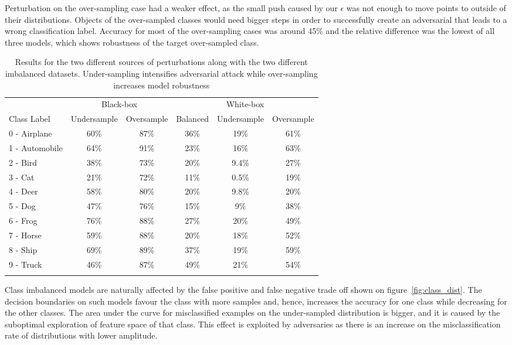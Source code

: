 \documentclass[runningheads,a4paper]{llncs}
\begin{document}
Perturbation on the over-sampling case had a weaker effect, as the small push caused by our $\epsilon$ was not enough to move points to outside of their distributions. Objects of the over-sampled classes would need bigger steps in order to successfully create an adversarial that leads to a wrong classification label. Accuracy for most of the over-sampling cases was around 45\% and the relative difference was the lowest of all three models, which shows robustness of the target over-sampled class. 
\begin{table}
	\centering	
	\begin{tabular}{lccccc}
		\toprule
		&\multicolumn{2}{c}{Black-box}
		&\multicolumn{3}{c}{White-box}
		\\\cmidrule(r){2-3}\cmidrule(l){4-6}
		Class Label &Undersample &Oversample &Balanced &Undersample &Oversample \\
		\midrule
		0 - Airplane &60\%& 87\% &36\%& 19\%    & 61\% \\
		1 - Automobile &64\%& 91\% &23\%& 16\%    & 63\% \\
		2 - Bird &38\%& 73\% &20\%& 9.4\%    & 27\% \\
		3 - Cat &21\%& 72\% &11\%& 0.5\%    & 19\% \\
		4 - Deer &58\%& 80\% &20\%& 9.8\%    & 20\% \\
		5 - Dog &47\%& 76\% &15\%& 9\%    & 38\% \\
		6 - Frog &76\%& 88\% &27\%& 20\%    & 49\% \\
		7 - Horse &59\%& 88\% &20\%& 18\%    & 52\% \\
		8 - Ship &69\%& 89\% &37\%& 19\%    & 59\% \\
		9 - Truck &46\%& 87\% &49\%& 21\%    & 54\% \\
		\bottomrule
		\hfill
	\end{tabular}
	\caption{Results for the two different sources of perturbations along with the two different imbalanced datasets. Under-sampling intensifies adversarial attack while over-sampling increases model robustness}
	\label{tbl:results}
\end{table}
Class imbalanced models are naturally affected by the false positive and false negative trade off shown on figure~\ref{fig:class_dist}. The decision boundaries on such models favour the class with more samples and, hence, increases the accuracy for one class while decreasing for the other classes. The area under the curve for misclassified examples on the under-sampled distribution is bigger, and it is caused by the suboptimal exploration of feature space of that class. This effect is exploited by adversaries as there is an increase on the misclassification rate of distributions with lower amplitude.
\end{document}
